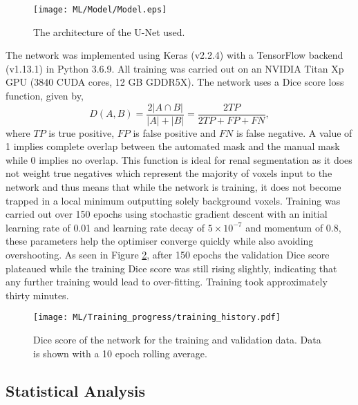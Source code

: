 \begin{figure}[h]
	\centering
	\texttt{[image: ML/Model/Model.eps]}
	\caption{The architecture of the U-Net used.}
	\label{fig:ml_network}	
\end{figure}

The network was implemented using Keras (v2.2.4) \cite{chollet_keras_2015} with a TensorFlow backend (v1.13.1) \cite{abadi_tensorflow_2015} in Python 3.6.9. All training was carried out on an NVIDIA Titan Xp \ac{GPU} (3840 CUDA cores, 12 GB GDDR5X). The network uses a Dice score loss function, given by,
\begin{equation}
	D\left(A, B\right) = \frac{2\left| A \cap B \right|}{\left|A\right|+\left|B\right|} = \frac{2TP}{2TP + FP + FN},
	\label{eq:dice}
\end{equation} 
where $TP$ is true positive, $FP$ is false positive and $FN$ is false negative. A value of 1 implies complete overlap between the automated mask and the manual mask while 0 implies no overlap. This function is ideal for renal segmentation as it does not weight true negatives which represent the majority of voxels input to the network and thus means that while the network is training, it does not become trapped in a local minimum outputting solely background voxels. Training was carried out over 150 epochs using stochastic gradient descent with an initial learning rate of 0.01 and learning rate decay of $5\times10^{-7}$ and momentum of 0.8, these parameters help the optimiser converge quickly while also avoiding overshooting. As seen in Figure \ref{fig:ml_training_history}, after 150 epochs the validation Dice score plateaued while the training Dice score was still rising slightly, indicating that any further training would lead to over-fitting. Training took approximately thirty minutes.

\begin{figure}[h]
	\centering
	\texttt{[image: ML/Training\_progress/training\_history.pdf]}
	\caption{Dice score of the network for the training and validation data. Data is shown with a 10 epoch rolling average.}
	\label{fig:ml_training_history}	
\end{figure}


\subsection{Statistical Analysis}

